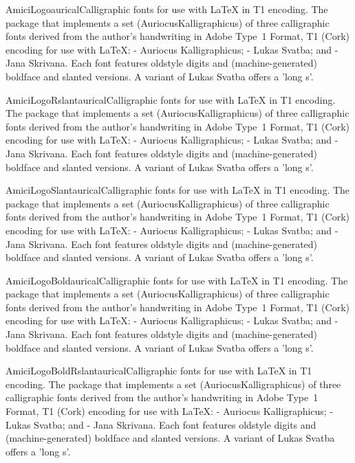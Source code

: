\documentclass{ddltxtyp}
\begin{document}
\begin{package}{AmiciLogo}{aurical}{Calligraphic fonts for use with {\LaTeX} in T1 encoding.}
The package that implements a set (AuriocusKalligraphicus) of
three calligraphic fonts derived from the author's handwriting
in Adobe Type~1 Format, T1 (Cork) encoding for use with {\LaTeX}:
- Auriocus Kalligraphicus; - Lukas Svatba; and - Jana Skrivana.
Each font features oldstyle digits and (machine-generated)
boldface and slanted versions. A variant of Lukas Svatba offers
a 'long s'.
\end{package}
\begin{package}{AmiciLogoRslant}{aurical}{Calligraphic fonts for use with {\LaTeX} in T1 encoding.}
The package that implements a set (AuriocusKalligraphicus) of
three calligraphic fonts derived from the author's handwriting
in Adobe Type~1 Format, T1 (Cork) encoding for use with {\LaTeX}:
- Auriocus Kalligraphicus; - Lukas Svatba; and - Jana Skrivana.
Each font features oldstyle digits and (machine-generated)
boldface and slanted versions. A variant of Lukas Svatba offers
a 'long s'.
\end{package}
\begin{package}{AmiciLogoSlant}{aurical}{Calligraphic fonts for use with {\LaTeX} in T1 encoding.}
The package that implements a set (AuriocusKalligraphicus) of
three calligraphic fonts derived from the author's handwriting
in Adobe Type~1 Format, T1 (Cork) encoding for use with {\LaTeX}:
- Auriocus Kalligraphicus; - Lukas Svatba; and - Jana Skrivana.
Each font features oldstyle digits and (machine-generated)
boldface and slanted versions. A variant of Lukas Svatba offers
a 'long s'.
\end{package}
\begin{package}{AmiciLogoBold}{aurical}{Calligraphic fonts for use with {\LaTeX} in T1 encoding.}
The package that implements a set (AuriocusKalligraphicus) of
three calligraphic fonts derived from the author's handwriting
in Adobe Type~1 Format, T1 (Cork) encoding for use with {\LaTeX}:
- Auriocus Kalligraphicus; - Lukas Svatba; and - Jana Skrivana.
Each font features oldstyle digits and (machine-generated)
boldface and slanted versions. A variant of Lukas Svatba offers
a 'long s'.
\end{package}
\begin{package}{AmiciLogoBoldRslant}{aurical}{Calligraphic fonts for use with {\LaTeX} in T1 encoding.}
The package that implements a set (AuriocusKalligraphicus) of
three calligraphic fonts derived from the author's handwriting
in Adobe Type~1 Format, T1 (Cork) encoding for use with {\LaTeX}:
- Auriocus Kalligraphicus; - Lukas Svatba; and - Jana Skrivana.
Each font features oldstyle digits and (machine-generated)
boldface and slanted versions. A variant of Lukas Svatba offers
a 'long s'.
\end{package}
\end{document}
